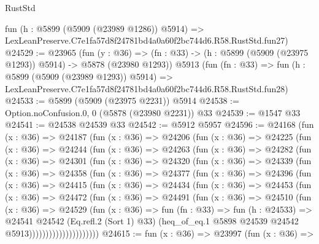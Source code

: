 \begin{lexlean}{RustStd}
\begin{coremodule}
{{    fun (h : @5899 (@5909 (@23989 @1286)) @5914) =>
    LexLeanPreserve.C7e1fa57d8f24781bd4a0a60f2bc744d6.R58.RustStd.fun27)
@24529 := @23965
    (fun (y : @36) =>
    (fn : @33) -> (h : @5899 (@5909 (@23975 @1293)) @5914) -> @5878 (@23980 @1293))
    @5913
    (fun (fn : @33) =>
    fun (h : @5899 (@5909 (@23989 @1293)) @5914) =>
    LexLeanPreserve.C7e1fa57d8f24781bd4a0a60f2bc744d6.R58.RustStd.fun28)
@24533 := @5899 (@5909 (@23975 @2231)) @5914
@24538 := Option.noConfusion.{0, 0} (@5878 (@23980 @2231)) @33
@24539 := @1547 @33
@24541 := @24538 @24539 @33
@24542 := @5912 @5957
@24596 := @24168
    (fun (x : @36) =>
    @24187
      (fun (x : @36) =>
      @24206
        (fun (x : @36) =>
        @24225
          (fun (x : @36) =>
          @24244
            (fun (x : @36) =>
            @24263
              (fun (x : @36) =>
              @24282
                (fun (x : @36) =>
                @24301
                  (fun (x : @36) =>
                  @24320
                    (fun (x : @36) =>
                    @24339
                      (fun (x : @36) =>
                      @24358
                        (fun (x : @36) =>
                        @24377
                          (fun (x : @36) =>
                          @24396
                            (fun (x : @36) =>
                            @24415
                              (fun (x : @36) =>
                              @24434
                                (fun (x : @36) =>
                                @24453
                                  (fun (x : @36) =>
                                  @24472
                                    (fun (x : @36) =>
                                    @24491
                                      (fun (x : @36) =>
                                      @24510
                                        (fun (x : @36) =>
                                        @24529
                                          (fun (x : @36) =>
                                          fun (fn : @33) =>
                                          fun (h : @24533) =>
                                          @24541
                                            @24542
                                            (Eq.refl.{2} (Sort 1) @33)
                                            (heq_of_eq.{1}
                                              @5898
                                              @24539
                                              @24542
                                              @5913)))))))))))))))))))))
@24615 := fun (x : @36) =>
  @23997
    (fun (x : @36) =>
}}
\end{coremodule}
\end{lexlean}
